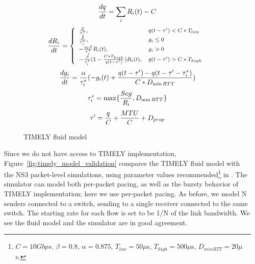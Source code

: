 \begin{figure}[h]
\fbox
{
\begin{minipage}{\columnwidth}
\begin{equation}
\small
\frac{{dq}}{{dt}} = \sum_{i} R_i(t) - C\\
\label{eq:timely_q}
\end{equation}
\begin{equation}
\small
\frac{{dR_i}}{{dt}} = \left\{ \begin{array}{ll}
\frac{\delta }{{\tau_i^*}}, & q(t - \tau ') < C*{T_{low}}\\
\frac{\delta }{{\tau_i^*}}, & g_i \le 0\\
 - \frac{{g_i\beta }}{{\tau_i^*}}R_i(t), & g_i > 0\\
 - \frac{\beta }{{\tau_i^*}}(1 - \frac{{C*{T_{high}}}}{{q(t - \tau ')}})R_i(t), & q(t - \tau ') > C*{T_{high}}
\end{array} \right.\\
\label{eq:timely_r}
\end{equation}
\begin{equation}
\small
\frac{{dg_i}}{{dt}} = \frac{\alpha }{{\tau_i^*}}( - g_i(t) + \frac{{q(t - \tau ') - q(t - \tau ' - \tau_i^*)}}{{C*{D_{\min RTT}}}})\\
\label{eq:timely_g}
\end{equation}
\begin{equation}
\small
\tau_i^* = \max \{ \frac{{Seg}}{R_i},{D_{\min RTT}}\} \\
\label{eq:timely_taus}
\end{equation}
\begin{equation}
\small
\tau ' = \frac{q}{C} + \frac{{MTU}}{C} + {D_{prop}}
\label{eq:timely_taup}
\end{equation}
\end{minipage}
}
\vspace{-0.5em}
\caption{TIMELY fluid model}
\vspace{-0.5em}
\label{fig:timely_model}
\end{figure}

Since we do not have access to TIMELY implementation,
Figure~\ref{fig:timely_model_validation} compares the TIMELY fluid model with
the NS3 packet-level simulations, using parameter values
recommended\footnote{$C=10Gbps$, $\beta=0.8$, $\alpha=0.875$, $T_{low} =
50\mu$s, $T_{high} = 500\mu$s, $D_{minRTT}= 20 \mu$s.} in \cite{timely}. The
simulator can model both per-packet pacing, as well as the bursty behavior of
TIMELY implementation; here we use per-packet pacing. As before, we model N
senders connected to a switch, sending to a single receiver connected to the
same switch.  The starting rate for each flow is set to be 1/N of the link
bandwidth. We see the fluid model and the simulator are in good agreement.

